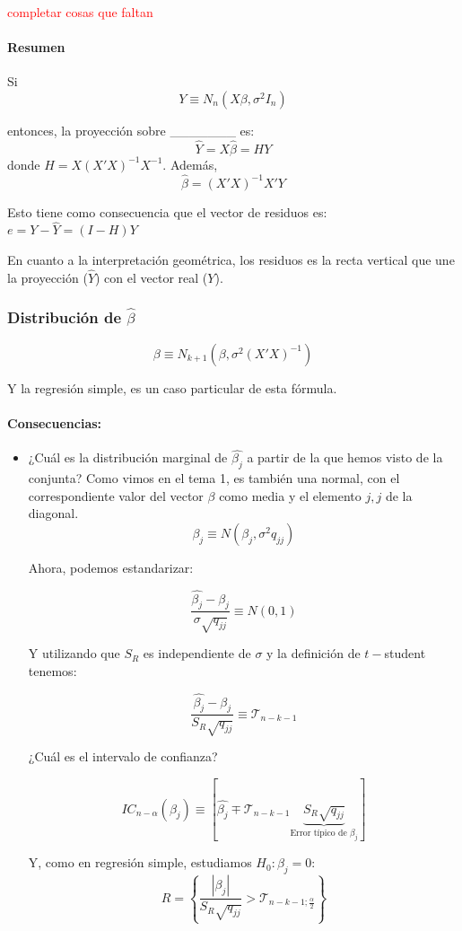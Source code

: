 \begin{itemize}
\textcolor{red}{completar cosas que faltan}

\paragraph{Resumen}
Si
\[ Y \equiv N_n (Xβ,σ^2I_n)\]

entonces, la proyección sobre \_\_\_\_\_\_\_ es:
\[
\hat{Y} = X\hat{β} = HY
\]
donde $H = X(X'X)^{-1}X^{-1}$. Además, \[\hat{β} = (X'X)^{-1}X'Y\]


Esto tiene como consecuencia que el vector de residuos es: $e = Y-\hat{Y} = (I-H) Y$

En cuanto a la interpretación geométrica, los residuos es la recta vertical que une la proyección ($\hat{Y}$) con el vector real ($Y$).

\subsubsection{Distribución de $\hat{β}$}
\[
β \equiv N_{k+1}\left(β,σ^2(X'X)^{-1}\right)
\]

Y la regresión simple, es un caso particular de esta fórmula.

\paragraph{Consecuencias:}

\begin{itemize}
	\item ¿Cuál es la distribución marginal de $\hat{β_j}$ a partir de la que hemos visto de la conjunta? Como vimos en el tema 1, es también una normal, con el correspondiente valor del vector $β$ como media y el elemento $j,j$ de la diagonal.
	\[ β_j \equiv N\left(β_j, σ^2q_{jj}\right)\]

	Ahora, podemos estandarizar:

	\[
	\frac{\hat{β_j}-β_j}{σ\sqrt{q_{jj}}} \equiv N(0,1)
	\]

	Y utilizando que $S_R$ es independiente de $σ$ y la definición de $t-$student tenemos:

	\[
	\frac{\hat{β_j}-β_j}{S_R\sqrt{q_{jj}}} \equiv \mathcal{T}_{n-k-1}
	\]

	¿Cuál es el intervalo de confianza?

	\[
		IC_{n-α}(β_j) \equiv \left[\hat{β_j}\mp \mathcal{T}_{n-k-1}\underbrace{S_R\sqrt{q_{jj}}}_{\text{Error típico de }β_j} \right]
	\]

	Y, como en regresión simple, estudiamos $H_0 : β_j = 0$:
	\[
		R = \left\{ \frac{|β_j|}{S_R\sqrt{q_{jj}}} > \mathcal{T}_{n-k-1;\frac{α}{2}} \right\}
	\]
\end{itemize}


\end{itemize}
